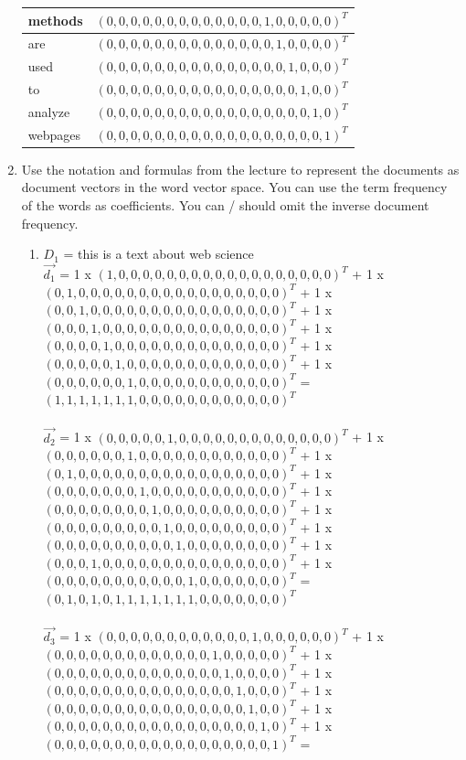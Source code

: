 \documentclass{WeSTassignment}
\begin{document}
\begin{enumerate}
\begin{tabular}{ | l | r | }
  methods & $(0,0,0,0,0,0,0,0,0,0,0,0,0,1,0,0,0,0,0)^{T}$\\ \hline
  are & $(0,0,0,0,0,0,0,0,0,0,0,0,0,0,1,0,0,0,0)^{T}$\\ \hline
  used & $(0,0,0,0,0,0,0,0,0,0,0,0,0,0,0,1,0,0,0)^{T}$ \\ \hline
  to & $(0,0,0,0,0,0,0,0,0,0,0,0,0,0,0,0,1,0,0)^{T}$\\ \hline
  analyze & $(0,0,0,0,0,0,0,0,0,0,0,0,0,0,0,0,0,1,0)^{T}$ \\ \hline
  webpages & $(0,0,0,0,0,0,0,0,0,0,0,0,0,0,0,0,0,0,1)^{T}$\\
  \hline
\end{tabular}
\item Use the notation and formulas from the lecture to represent the documents as document vectors in the word vector space. You can use the term frequency of the words as coefficients. You can / should omit the inverse document frequency.
\begin{enumerate}
\item  $D_1$ = this is a text about web science 
\\ $\vec{d_1}$ = 1 x $(1,0,0,0,0,0,0,0,0,0,0,0,0,0,0,0,0,0,0)^{T}$ + 1 x $(0,1,0,0,0,0,0,0,0,0,0,0,0,0,0,0,0,0,0)^{T}$ + 1 x $(0,0,1,0,0,0,0,0,0,0,0,0,0,0,0,0,0,0,0)^{T}$ + 1 x$(0,0,0,1,0,0,0,0,0,0,0,0,0,0,0,0,0,0,0)^{T}$ + 1 x $(0,0,0,0,1,0,0,0,0,0,0,0,0,0,0,0,0,0,0)^{T}$ + 1 x
$(0,0,0,0,0,1,0,0,0,0,0,0,0,0,0,0,0,0,0)^{T}$ + 1 x 
$(0,0,0,0,0,0,1,0,0,0,0,0,0,0,0,0,0,0,0)^{T}$ =
\\$(1,1,1,1,1,1,1,0,0,0,0,0,0,0,0,0,0,0,0)^{T}$
\\\\  $\vec{d_2}$ = 1 x $(0,0,0,0,0,1,0,0,0,0,0,0,0,0,0,0,0,0,0)^{T}$ + 1 x 
$(0,0,0,0,0,0,1,0,0,0,0,0,0,0,0,0,0,0,0)^{T}$ + 1 x $(0,1,0,0,0,0,0,0,0,0,0,0,0,0,0,0,0,0,0)^{T}$ + 1 x$(0,0,0,0,0,0,0,1,0,0,0,0,0,0,0,0,0,0,0)^{T}$ + 1 x  $(0,0,0,0,0,0,0,0,1,0,0,0,0,0,0,0,0,0,0)^{T}$ + 1 x $(0,0,0,0,0,0,0,0,0,1,0,0,0,0,0,0,0,0,0)^{T}$ + 1 x
$(0,0,0,0,0,0,0,0,0,0,1,0,0,0,0,0,0,0,0)^{T}$ + 1 x
$(0,0,0,1,0,0,0,0,0,0,0,0,0,0,0,0,0,0,0)^{T}$ + 1 x $(0,0,0,0,0,0,0,0,0,0,0,1,0,0,0,0,0,0,0)^{T}$ = 
\\$(0,1,0,1,0,1,1,1,1,1,1,1,0,0,0,0,0,0,0)^{T}$
\\\\  $\vec{d_3}$ = 1 x $(0,0,0,0,0,0,0,0,0,0,0,0,1,0,0,0,0,0,0)^{T}$ + 1 x $(0,0,0,0,0,0,0,0,0,0,0,0,0,1,0,0,0,0,0)^{T}$ + 1 x $(0,0,0,0,0,0,0,0,0,0,0,0,0,0,1,0,0,0,0)^{T}$ + 1 x $(0,0,0,0,0,0,0,0,0,0,0,0,0,0,0,1,0,0,0)^{T}$ + 1 x  $(0,0,0,0,0,0,0,0,0,0,0,0,0,0,0,0,1,0,0)^{T}$ + 1 x $(0,0,0,0,0,0,0,0,0,0,0,0,0,0,0,0,0,1,0)^{T}$ + 1 x $(0,0,0,0,0,0,0,0,0,0,0,0,0,0,0,0,0,0,1)^{T}$ = 

\end{enumerate}
\end{enumerate}
\end{document}
